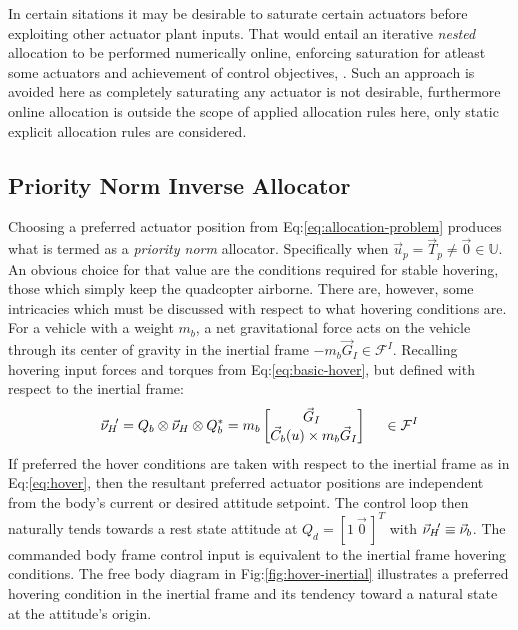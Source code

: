 \par
In certain sitations it may be desirable to saturate certain actuators before exploiting other actuator plant inputs. That would entail an iterative \emph{nested} allocation to be performed numerically online, enforcing saturation for atleast some actuators and achievement of control objectives, \cite{allocation}. Such an approach is avoided here as completely saturating any actuator is not desirable, furthermore online allocation is outside the scope of applied allocation rules here, only static explicit allocation rules are considered.
\subsection{Priority Norm Inverse Allocator}
\label{subsec:allocation.allocators.norminverse}
Choosing a preferred actuator position from Eq:\ref{eq:allocation-problem} produces what is termed as a \emph{priority norm} allocator. Specifically when $\vec{u}_p=\vec{T}_p\not=\vec{0}\in\mathbb{U}$. An obvious choice for that value are the conditions required for stable hovering, those which simply keep the quadcopter airborne. There are, however, some intricacies which must be discussed with respect to what hovering conditions are.
\newpage
For a vehicle with a weight $m_b$, a net gravitational force acts on the vehicle through its center of gravity in the inertial frame $-m_b\vec{G}_I\in\mathcal{F}^I$. Recalling hovering input forces and torques from Eq:\ref{eq:basic-hover}, but defined with respect to the inertial frame:
\begin{equation}\label{eq:hover}
\vec{\nu}_H\text{}\hspace{-2pt}'=Q_b\otimes\vec{\nu}_H\otimes Q_b^*
=
m_b\begin{bmatrix}
\vec{G}_I\hspace{3pt}\\
\vec{C}_b(u) \times m_b\vec{G}_I
\end{bmatrix}~~~~\in\mathcal{F}^I
\end{equation}
If preferred the hover conditions are taken with respect to the inertial frame as in Eq:\ref{eq:hover}, then the resultant preferred actuator positions are independent from the body's current or desired attitude setpoint. The control loop then naturally tends towards a rest state attitude at $Q_d=[1~\vec{0}\hspace{2pt}]^T$ with $\vec{\nu}_H\text{}\hspace{-2pt}'\equiv\vec{\nu}_b$. The commanded body frame control input is equivalent to the inertial frame hovering conditions. The free body diagram in Fig:\ref{fig:hover-inertial} illustrates a preferred hovering condition in the inertial frame and its tendency toward a natural state at the attitude's origin.
